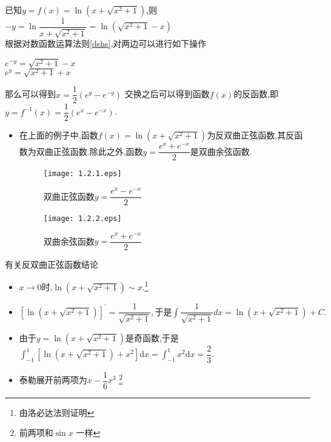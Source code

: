 \documentclass[8pt a4paper, oneside, UTF8]{ctexbook}  %
\begin{document}
\begin{sloppypar}
\begin{problem}
    \end{problem}
    \begin{solution}
        已知$y=f(x)=\ln(x+\sqrt{x^2+1})$,则$-y=\ln \dfrac{1}{x+\sqrt{x^2+1}}=\ln(\sqrt{x^2+1}-x)$\\
        根据对数函数运算法则\ref{dshs},对两边可以进行如下操作
        \begin{center}
            $e^{-y}=\sqrt{x^2+1}-x$\\
            $e^{y}=\sqrt{x^2+1}+x$\\
        \end{center}
        那么可以得到$x=\dfrac{1}{2}(e^y-e^{-y})$
        交换之后可以得到函数$f(x)$的反函数,即
        $y=f^{-1}(x)=\dfrac{1}{2}(e^x-e^{-x})$.
    \end{solution}
    \begin{note}
        \begin{itemize}
            \item 在上面的例子中,函数$f(x)=\ln(x+\sqrt{x^2+1})$为反双曲正弦函数,其反函数为双曲正弦函数.除此之外,函数$y=\dfrac{e^x+e^{-x}}{2}$是双曲余弦函数.
                  \begin{figure}[H]
                      \begin{minipage}[t]{0.5\linewidth}
                          \centering
                          \texttt{[image: 1.2.1.eps]}
                          \caption{双曲正弦函数$y=\dfrac{e^x-e^{-x}}{2}$}
                      \end{minipage}%
                      \begin{minipage}[t]{0.5\linewidth}
                          \centering
                          \texttt{[image: 1.2.2.eps]}
                          \caption{双曲余弦函数$y=\dfrac{e^x+e^{-x}}{2}$}
                      \end{minipage}
                  \end{figure}
        \end{itemize}
    \end{note}
    \begin{conclusion}{有关反双曲正弦函数结论}{}
        \begin{itemize}
            \item $x\to0\text{时,}\ln\left(x+\sqrt{x^{2}+1}\right)\sim x.$\footnote{由洛必达法则证明}
            \item $\left[\ln\left(x+\sqrt{x^{2}+1}\right)\right]^{\prime}=\dfrac{1}{\sqrt{x^{2}+1}},\text{于是}\int\dfrac{1}{\sqrt{x^{2}+1}}dx=\ln\left(x+\sqrt{x^{2}+1}\right)+C.$
            \item 由于$y=\ln\left(x+\sqrt{x^2+1}\right)$是奇函数,于是$\int_{-1}^1\left[\ln\left(x+\sqrt{x^2+1}\right)+x^2\right]\mathrm{d}x=\int_{-1}^1x^2\mathrm{d}x=\dfrac 23.$
            \item 泰勒展开前两项为$x-\dfrac{1}{6}x^3$ \footnote{前两项和$\sin x$ 一样}
        \end{itemize}
    \end{conclusion}

\end{sloppypar}
\end{document}
